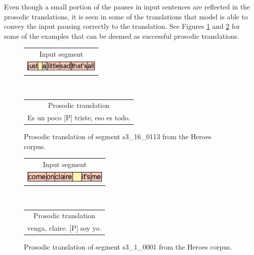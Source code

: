 Even though a small portion of the pauses in input sentences are reflected in the prosodic translations, it is seen in some of the translations that model is able to convey the input pausing correctly to the translation. See Figures \ref{transprose:figure:q3:goodone1} and \ref{transprose:figure:q3:goodone2} for some of the examples that can be deemed as successful prosodic translations. 

\begin{figure}[h!]
\centering
\begin{tabular}{c}
Input segment \\
\includegraphics[height=0.5cm]{img/s3_16_0113.png} \\
\end{tabular}
\\
\begin{tabular}{c}
Prosodic translation \\
Es un poco [P] triste, eso es todo. \\
\end{tabular}
\caption{Prosodic translation of segment s3\_16\_0113 from the Heroes corpus.}
\label{transprose:figure:q3:goodone1}
\end{figure}

\begin{figure}[h!]
\centering
\begin{tabular}{c}
Input segment \\
\includegraphics[height=0.5cm]{img/s3_1_0001.png} \\
\end{tabular}
\\
\begin{tabular}{c}
Prosodic translation \\
venga, claire. [P] soy yo. \\
\end{tabular}
\caption{Prosodic translation of segment s3\_1\_0001 from the Heroes corpus.}
\label{transprose:figure:q3:goodone2}
\end{figure}

